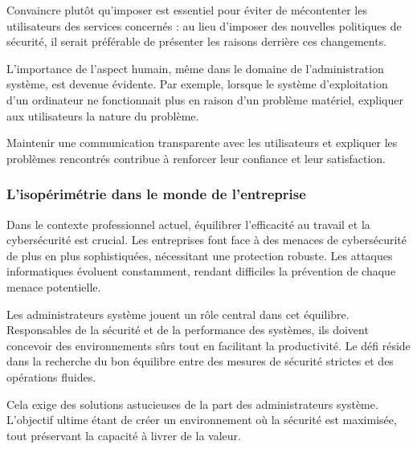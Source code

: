 Convaincre plutôt qu'imposer est essentiel pour éviter de mécontenter les utilisateurs des services concernés : au lieu d'imposer des nouvelles politiques de sécurité, il serait préférable de présenter les raisons derrière ces changements.

L'importance de l'aspect humain, même dans le domaine de l'administration système, est devenue évidente.
Par exemple, lorsque le système d'exploitation d'un ordinateur ne fonctionnait plus en raison d'un problème matériel, expliquer aux utilisateurs la nature du problème.

Maintenir une communication transparente avec les utilisateurs et expliquer les problèmes rencontrés contribue à renforcer leur confiance et leur satisfaction.

\subsubsection{L'isopérimétrie dans le monde de l'entreprise}
Dans le contexte professionnel actuel, équilibrer l'efficacité au travail et la cybersécurité est crucial.
Les entreprises font face à des menaces de cybersécurité de plus en plus sophistiquées, nécessitant une protection robuste.
Les attaques informatiques évoluent constamment, rendant difficiles la prévention de chaque menace potentielle.

Les administrateurs système jouent un rôle central dans cet équilibre.
Responsables de la sécurité et de la performance des systèmes, ils doivent concevoir des environnements sûrs tout en facilitant la productivité.
Le défi réside dans la recherche du bon équilibre entre des mesures de sécurité strictes et des opérations fluides.

Cela exige des solutions astucieuses de la part des administrateurs système.
L'objectif ultime étant de créer un environnement où la sécurité est maximisée, tout préservant la capacité à livrer de la valeur.





